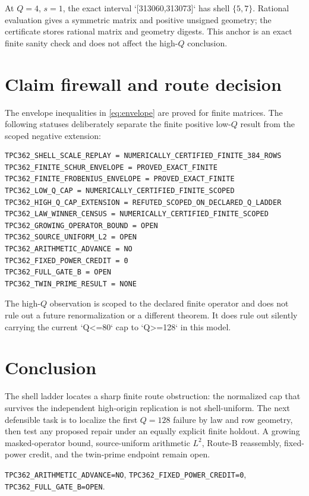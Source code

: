 \documentclass[10pt]{article}
\begin{document}
At $Q=4$, $s=1$, the exact interval `[313060,313073]` has shell $\{5,7\}$.
Rational evaluation gives a symmetric matrix and positive unsigned geometry;
the certificate stores rational matrix and geometry digests.  This anchor is
an exact finite sanity check and does not affect the high-$Q$ conclusion.

\section{Claim firewall and route decision}

The envelope inequalities in \eqref{eq:envelope} are proved for finite
matrices.  The following statuses deliberately separate the finite positive
low-$Q$ result from the scoped negative extension:

\begin{verbatim}
TPC362_SHELL_SCALE_REPLAY = NUMERICALLY_CERTIFIED_FINITE_384_ROWS
TPC362_FINITE_SCHUR_ENVELOPE = PROVED_EXACT_FINITE
TPC362_FINITE_FROBENIUS_ENVELOPE = PROVED_EXACT_FINITE
TPC362_LOW_Q_CAP = NUMERICALLY_CERTIFIED_FINITE_SCOPED
TPC362_HIGH_Q_CAP_EXTENSION = REFUTED_SCOPED_ON_DECLARED_Q_LADDER
TPC362_LAW_WINNER_CENSUS = NUMERICALLY_CERTIFIED_FINITE_SCOPED
TPC362_GROWING_OPERATOR_BOUND = OPEN
TPC362_SOURCE_UNIFORM_L2 = OPEN
TPC362_ARITHMETIC_ADVANCE = NO
TPC362_FIXED_POWER_CREDIT = 0
TPC362_FULL_GATE_B = OPEN
TPC362_TWIN_PRIME_RESULT = NONE
\end{verbatim}

The high-$Q$ observation is scoped to the declared finite operator and does
not rule out a future renormalization or a different theorem.  It does rule
out silently carrying the current `Q<=80` cap to `Q>=128` in this model.

\section{Conclusion}

The shell ladder locates a sharp finite route obstruction: the normalized cap
that survives the independent high-origin replication is not shell-uniform.
The next defensible task is to localize the first $Q=128$ failure by law and
row geometry, then test any proposed repair under an equally explicit finite
holdout.  A growing masked-operator bound, source-uniform arithmetic $L^2$,
Route-B reassembly, fixed-power credit, and the twin-prime endpoint remain
open.

\begin{center}\small
\texttt{TPC362\_ARITHMETIC\_ADVANCE=NO},\quad
\texttt{TPC362\_FIXED\_POWER\_CREDIT=0},\quad
\texttt{TPC362\_FULL\_GATE\_B=OPEN}.
\end{center}
\end{document}
